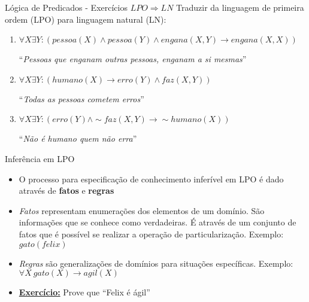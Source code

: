 \begin{frame}[t]{Lógica de Predicados - Exercícios $LPO \Rightarrow LN$}
	Traduzir da linguagem de primeira ordem (LPO) para linguagem natural (LN):
	
	\begin{enumerate} \itemsep 0.5cm
	\item $\forall X \exists Y: (pessoa(X) \wedge pessoa(Y) \wedge engana(X,Y) \rightarrow engana(X,X))$ 
	\begin{center}
	``{\it Pessoas que enganam outras pessoas, enganam a si mesmas}''
	\end{center}

	\item $\forall X \exists Y: (humano(X) \rightarrow erro(Y) \wedge faz(X,Y))$ 
	\begin{center}
	``{\it Todas as pessoas cometem erros}''
	\end{center}

	\item $\forall X \exists Y: (erro(Y) \wedge\sim faz(X,Y) \rightarrow\sim humano(X))$
	\begin{center}
	``{\it Não é humano quem não erra}''
	\end{center}

	\end{enumerate}
\end{frame}

\begin{frame}[t]{Inferência em LPO}	
	\begin{itemize}
	\item O processo para especificação de conhecimento inferível em LPO é dado através de {\bf fatos} e {\bf regras}

	\item {\it Fatos} representam enumerações dos elementos de um domínio. São informações que se conhece como verdadeiras. É através de um conjunto de fatos que é possível se realizar a operação de particularização. Exemplo: $gato(felix)$

	\item {\it Regras} são generalizações de domínios para situações específicas. Exemplo: $\forall X ~ gato(X) \rightarrow agil(X)$

	\item {\bf \underline{Exercício:}} Prove que ``Felix é ágil''
	\end{itemize}
\end{frame}

